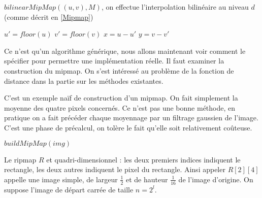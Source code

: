 \medbreak
\medbreak
\medbreak
\medbreak

\begin{algorithm}[H]
\caption{$bilinearMipMap((u,v),M)$,  on effectue l'interpolation bilinéaire au niveau $d$ (comme décrit en \ref{Mipmap})}
\label{intertri2}
$u'=floor(u)$\;
$v' = floor(v)$\;
$x=u-u'$\;
$y = v-v'$\;
\;
\end{algorithm}

\medbreak
\medbreak
Ce n'est qu'un algorithme générique, nous allons maintenant voir comment le spécifier pour permettre une implémentation réelle. Il faut examiner la construction du mipmap. On s'est intéressé au problème de la fonction de distance dans la partie sur les méthodes existantes. %


C'est un exemple naïf de construction d'un mipmap. On fait simplement la moyenne des quatre pixels concernés. Ce n'est pas une bonne méthode, en pratique on a fait précéder chaque moyennage par un filtrage gaussien de l'image. C'est une phase de précalcul, on tolère le fait qu'elle soit relativement coûteuse.

 \medbreak
  \medbreak
 \begin{algorithm}[H]
 \caption{$buildMipMap(img)$}
 \label{buildMipmap}
 \end{algorithm}
 \medbreak
  \medbreak

\label{pseudo_code_Ripmap}



Le ripmap $R$ et quadri-dimensionnel  : les deux premiers indices indiquent le rectangle, les deux autres indiquent le pixel du rectangle. Ainsi appeler $R[2][4]$ appelle une image simple, de largeur $\frac{1}{2}$ et de hauteur $\frac{1}{16}$ de l'image d'origine. On suppose l'image de départ carrée de taille $n=2^l$.


